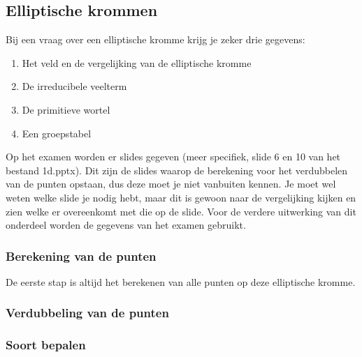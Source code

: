 \subsection{Elliptische krommen}
Bij een vraag over een elliptische kromme krijg je zeker drie gegevens:
\begin{enumerate}
 \item Het veld en de vergelijking van de elliptische kromme
 \item De irreducibele veelterm
 \item De primitieve wortel
 \item Een groepstabel
\end{enumerate}

Op het examen worden er slides gegeven (meer specifiek, slide 6 en 10 van het bestand 1d.pptx). Dit zijn de slides waarop de berekening voor het verdubbelen van de punten opstaan, dus deze moet je niet  vanbuiten kennen. Je moet wel weten welke slide je nodig hebt, maar dit is gewoon naar de vergelijking kijken en zien welke er overeenkomt met die op de slide. Voor de verdere uitwerking van dit onderdeel worden de gegevens van het examen gebruikt.



\subsubsection{Berekening van de punten}
De eerste stap is altijd het berekenen van alle punten op deze elliptische kromme. 

\subsubsection{Verdubbeling van de punten}

\subsubsection{Soort bepalen}
